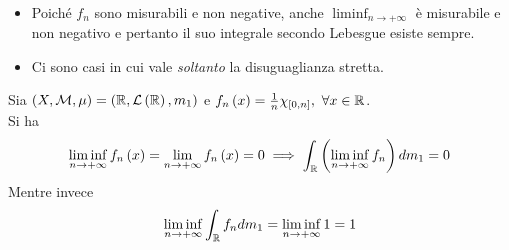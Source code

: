 \begin{observe}~{}
	\begin{itemize}
		\item Poiché $f_n$ sono misurabili e non negative, anche $\liminf_{n\to+\infty}$ è misurabile e non negativo e pertanto il suo integrale secondo Lebesgue esiste sempre. 
		\item Ci sono casi in cui vale \textit{soltanto} la disuguaglianza stretta.
	\end{itemize}
\end{observe}
\begin{examplewt}
	Sia $\left(X,\mathcal{M},\mu\right)=\left(\mathbb{R},\mathcal{L}\left(\mathbb{R}\right),m_1\right)$ e $f_n\left(x\right)=\frac{1}{n}\chi_{\left[0,n\right]},\ \forall x\in\realset$.\\
	Si ha
	\begin{equation*}
		\liminf_{n\to+\infty}f_n\left(x\right)=\lim_{n\to+\infty}f_n\left(x\right)=0\\
		\implies\int_{\mathbb{R}}\left(\liminf_{n\to+\infty}f_n\right)dm_1=0
	\end{equation*}
	Mentre invece
	\begin{equation*}
		\liminf_{n\to+\infty}\int_{\mathbb{R}}f_ndm_1=\liminf_{n\to+\infty}1=1
	\end{equation*}
\end{examplewt}
